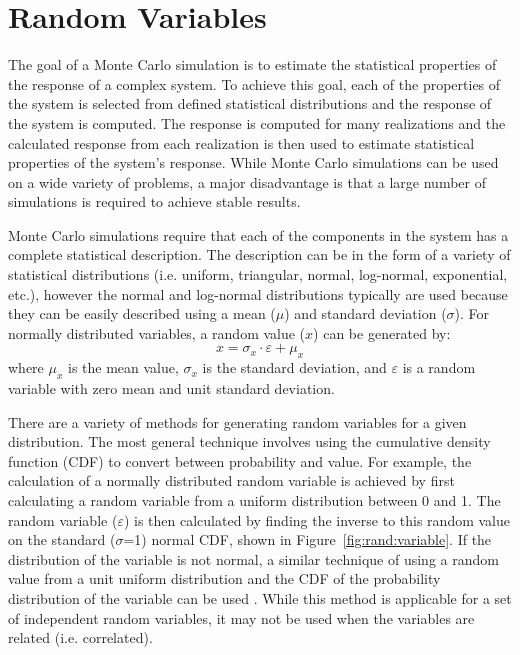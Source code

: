 \documentclass[12pt,oneside]{book}
\begin{document}
\section{Random Variables}
The goal of a Monte Carlo simulation is to estimate the statistical properties of the response of a
complex system.  To achieve this goal, each of the properties of the system is selected from defined
statistical distributions and the response of the system is computed.  The response is computed for
many realizations and the calculated response from each realization is then used to estimate
statistical properties of the system's response. While Monte Carlo simulations can be used on a wide
variety of problems, a major disadvantage is that a large number of simulations is required to
achieve stable results.

Monte Carlo simulations require that each of the components in the system has a complete statistical
description.  The description can be in the form of a variety of statistical distributions (i.e.
uniform, triangular, normal, log-normal, exponential, etc.), however the normal and log-normal
distributions typically are used because they can be easily described using a mean ($\mu$) and
standard deviation ($\sigma$).  For normally distributed variables, a random value ($x$) can be
generated by:
\begin{equation}
    x = \sigma_x \cdot \varepsilon + \mu_x
    \label{eq:randVar}
\end{equation}
where $\mu_x$ is the mean value, $\sigma_x$ is the standard deviation, and $\varepsilon$ is a random
variable with zero mean and unit standard deviation.  

There are a variety of methods for generating random variables for a given distribution.  The most
general technique involves using the cumulative density function (CDF) to convert between
probability and value.  For example, the calculation of a normally distributed random variable is
achieved by first calculating a random variable from a uniform distribution between 0 and 1.  The
random variable ($\varepsilon$) is then calculated by finding the inverse to this random value on
the standard ($\sigma$=1) normal CDF, shown in Figure~\ref{fig:rand:variable}.  If the distribution
of the variable is not normal, a similar technique of using a random value from a unit uniform
distribution and the CDF of the probability distribution of the variable can be used
\citep{ang:vol2}.  While this method is applicable for a set of independent random variables, it may
not be used when the variables are related (i.e. correlated).
\end{document}

